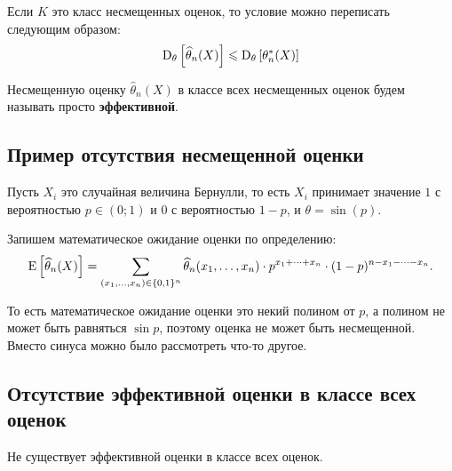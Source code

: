 Если $K$ это класс несмещенных оценок, то условие можно переписать следующим образом:
\begin{equation*}
    \operatorname{D}_{\theta} \left[ \widehat{\theta}_n(X) \right] \leqslant \operatorname{D}_{\theta} \left[ \theta_n^*(X) \right]
\end{equation*}

\begin{definition*}
    Несмещенную оценку $\widehat{\theta}_n(X)$ в классе всех несмещенных оценок будем называть просто \textbf{эффективной}.
\end{definition*} 

\subsection{Пример отсутствия несмещенной оценки}

\begin{example}
    Пусть $X_i$ это случайная величина Бернулли, то есть $X_i$ принимает значение $1$ с вероятностью $p \in (0; 1)$ и $0$ с вероятностью $1 - p$, и $\theta = \sin(p)$.

    Запишем математическое ожидание оценки по определению:
    \begin{equation*}
        \operatorname{E} \left[\widehat{\theta}_n(X)\right]
        = \sum_{(x_1, \dots, x_n) \in \{0, 1\}^n} \widehat{\theta}_n (x_1, \dots, x_n) \cdot p^{x_1 + \dots + x_n} \cdot (1 - p)^{n - x_1 - \dots - x_n}.
    \end{equation*}

    То есть математическое ожидание оценки это некий полином от $p$, а полином не может быть равняться $\sin p$, поэтому оценка не может быть несмещенной. Вместо синуса можно было рассмотреть что-то другое.
\end{example}

\subsection{Отсутствие эффективной оценки в классе всех оценок}

\begin{proposition*}
    Не существует эффективной оценки в классе всех оценок.
\end{proposition*}


